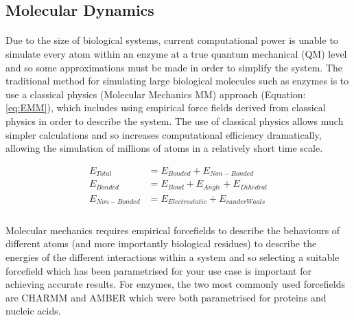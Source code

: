 \subsection{Molecular Dynamics}
\paragraph{}
Due to the size of biological systems, current computational power is unable to simulate every atom within an enzyme at a true quantum mechanical (QM) level and so some approximations must be made in order to simplify the system. The traditional method for simulating large biological molecules such as enzymes is to use a classical physics (Molecular Mechanics MM) approach (Equation: \ref{eq:EMM}), which includes using empirical force fields derived from classical physics in order to describe the system. The use of classical physics allows much simpler calculations and so increases computational efficiency dramatically, allowing the simulation of millions of atoms in a relatively short time scale. 

\begin{equation}
\label{eq:EMM}
\begin{split}
E_{Total} & = E_{Bonded} + E_{Non-Bonded} \\
E_{Bonded} & = E_{Bond} + E_{Angle} + E_{Dihedral} \\
E_{Non-Bonded} & = E_{Electrostatic} + E_{van der Waals} \\
\end{split}
\end{equation}

\paragraph{}
Molecular mechanics requires empirical forcefields to describe the behaviours of different atoms (and more importantly biological residues) to describe the energies of the different interactions within a system and so selecting a suitable forcefield which has been parametrised for your use case is important for achieving accurate results. For enzymes, the two most commonly used forcefields are CHARMM\cite{} and AMBER\cite{} which were both parametrised for proteins and nucleic acids. 


